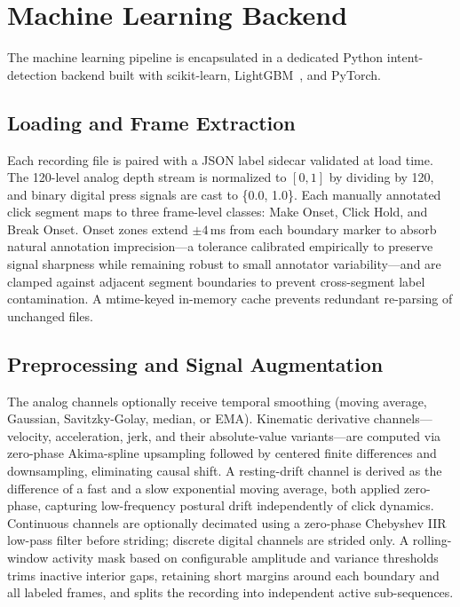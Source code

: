 \section{Machine Learning Backend}
\label{sec:ml_backend}

The machine learning pipeline is encapsulated in a dedicated Python intent-detection backend built with scikit-learn, LightGBM~\cite{ke_lightgbm_2017}, and PyTorch.

\subsection{Loading and Frame Extraction}
Each recording file is paired with a JSON label sidecar validated at load time. The 120-level analog depth stream is normalized to $[0,1]$ by dividing by 120, and binary digital press signals are cast to \{0.0, 1.0\}. Each manually annotated click segment maps to three frame-level classes: Make Onset, Click Hold, and Break Onset. Onset zones extend $\pm 4$\,ms from each boundary marker to absorb natural annotation imprecision---a tolerance calibrated empirically to preserve signal sharpness while remaining robust to small annotator variability---and are clamped against adjacent segment boundaries to prevent cross-segment label contamination. A mtime-keyed in-memory cache prevents redundant re-parsing of unchanged files.

\subsection{Preprocessing and Signal Augmentation}
The analog channels optionally receive temporal smoothing (moving average, Gaussian, Savitzky-Golay, median, or EMA). Kinematic derivative channels---velocity, acceleration, jerk, and their absolute-value variants---are computed via zero-phase Akima-spline upsampling followed by centered finite differences and downsampling, eliminating causal shift. A resting-drift channel is derived as the difference of a fast and a slow exponential moving average, both applied zero-phase, capturing low-frequency postural drift independently of click dynamics. Continuous channels are optionally decimated using a zero-phase Chebyshev IIR low-pass filter before striding; discrete digital channels are strided only. A rolling-window activity mask based on configurable amplitude and variance thresholds trims inactive interior gaps, retaining short margins around each boundary and all labeled frames, and splits the recording into independent active sub-sequences.

